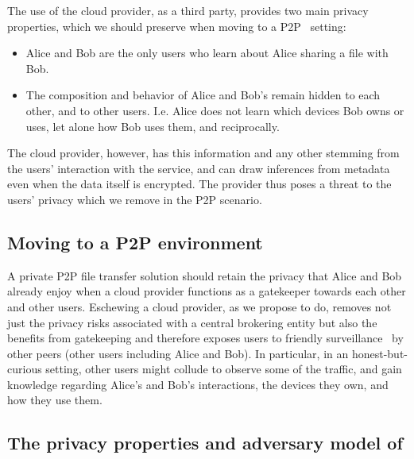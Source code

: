 The use of the cloud provider, as a third party,
provides two main privacy properties, which we should preserve when
moving to a P2P~\cite{DevilInMetadata} setting:
\begin{itemize}
\item Alice and Bob are the only users who learn 
about Alice sharing a file with Bob.
\item The composition and behavior of Alice and Bob's \squad remain
  hidden to each other, and to other users. I.e. Alice does not learn
  which devices Bob owns or uses, let alone how Bob uses them, and
  reciprocally.
\end{itemize} 
The cloud provider, however, has this information and any other
stemming from the users' interaction with the service, and can draw
inferences from metadata even when the data itself is encrypted. The
provider thus poses a threat to the users' privacy which we remove in
the P2P scenario.


\subsection{Moving to a P2P environment}
A private P2P file transfer solution should retain the privacy that
Alice and Bob already enjoy when a cloud provider functions as a
gatekeeper towards each other and other users.  Eschewing a cloud
provider, as we propose to do, removes not just the privacy risks
associated with a central brokering entity but also the benefits from
gatekeeping and therefore exposes users to friendly
surveillance~\cite{FriendlySurveillance} by other peers (other \name
users including Alice and Bob). In particular, in an
honest-but-curious setting, other users might collude to observe some
of the traffic, and gain knowledge regarding Alice's and Bob's
interactions, the devices they own, and how they use them.

\subsection{The privacy properties and adversary model of \name}

